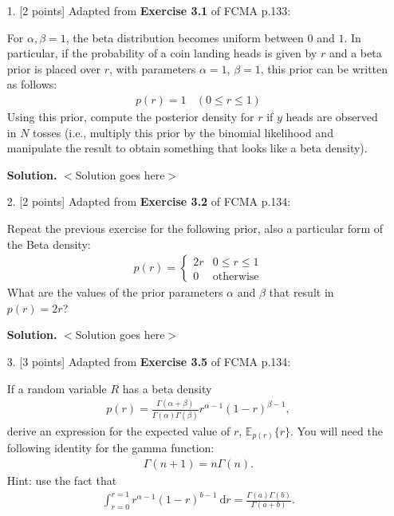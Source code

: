 \documentclass[10pt]{article}
\begin{document}
\newpage
\begin{itemize}

\item[1.]  [2 points]
Adapted from {\bf Exercise 3.1} of FCMA p.133:

For $\alpha, \beta = 1$, the beta distribution becomes uniform between $0$ and $1$.  In particular, if the probability of a coin landing heads is given by $r$ and a beta prior is placed over $r$, with parameters $\alpha = 1$, $\beta = 1$, this prior can be written as follows:
\begin{eqnarray*}
p(r) = 1 ~~~~ (0 \leq r \leq 1)
\end{eqnarray*}
Using this prior, compute the posterior density for $r$ if $y$ heads are observed in $N$ tosses (i.e., multiply this prior by the binomial likelihood and manipulate the result to obtain something that looks like a beta density).

{\bf Solution.} $<$Solution goes here$>$



\item[2.]  [2 points]
Adapted from {\bf Exercise 3.2} of FCMA p.134:

Repeat the previous exercise for the following prior, also a particular form of the Beta density:
\begin{eqnarray*}
p(r) = 
\begin{cases}
2r & 0 \leq r \leq 1 \\
0 & \mathrm{otherwise}
\end{cases}
\end{eqnarray*}
What are the values of the prior parameters $\alpha$ and $\beta$ that result in $p(r)= 2r$?

{\bf Solution.} $<$Solution goes here$>$



\item[3.]  [3 points]
Adapted from {\bf Exercise 3.5} of FCMA p.134:

If a random variable $R$ has a beta density
\begin{eqnarray*}
p(r) = \frac{\Gamma(\alpha + \beta)}{\Gamma(\alpha) \Gamma(\beta)} r^{\alpha - 1}(1 - r)^{\beta - 1},
\end{eqnarray*}
derive an expression for the expected value of $r$, $\mathbb{E}_{p(r)}\{r\}$.  You will need the following identity for the gamma function:
\begin{eqnarray*}
\Gamma(n + 1) = n \Gamma(n).
\end{eqnarray*}
Hint: use the fact that
\begin{eqnarray*}
\int_{r=0}^{r=1} r^{\alpha - 1}(1 - r)^{b - 1}~\mathrm{d}r = \frac{\Gamma(a) \Gamma(b)}{\Gamma(a + b)}.
\end{eqnarray*}


\end{itemize}
\end{document}
